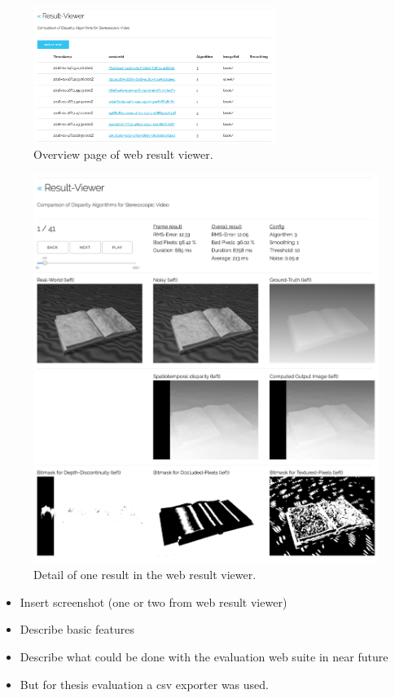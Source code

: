 \begin{figure}[p!]
  \centering
  \includegraphics[angle=90,width=0.7\textwidth]{src/images/result-viewer-overview.png}
  \caption{Overview page of web result viewer.}
  \label{fig:web-overview}
\end{figure}

\begin{figure}[p!]
  \centering
  \includegraphics[angle=90,width=1.0\textwidth]{src/images/result-viewer-detail.png}
  \caption{Detail of one result in the web result viewer.}
  \label{fig:web-detail}
\end{figure}

\begin{itemize}
  \item Insert screenshot (one or two from web result viewer)
  \item Describe basic features
  \item Describe what could be done with the evaluation web suite in near future
  \item But for thesis evaluation a csv exporter was used.
\end{itemize}

